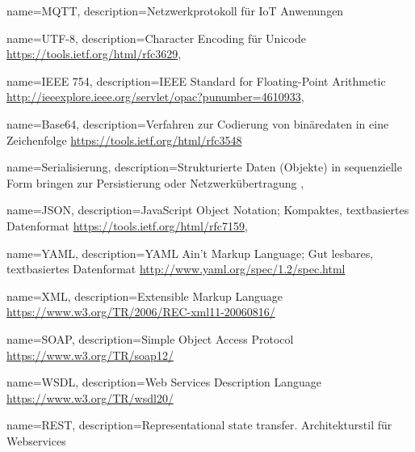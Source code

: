 








{
    name=MQTT,
    description={Netzwerkprotokoll für IoT Anwenungen}
}


{
    name=UTF-8,
    description={Character Encoding für Unicode \url{https://tools.ietf.org/html/rfc3629}}, 
}

{
    name=IEEE 754,
    description={IEEE Standard for Floating-Point Arithmetic   \url{http://ieeexplore.ieee.org/servlet/opac?punumber=4610933}}, 
}


{
    name=Base64,
    description={Verfahren zur Codierung von binäredaten in eine Zeichenfolge
     \url{https://tools.ietf.org/html/rfc3548}}
}

{
    name=Serialisierung,
    description={Strukturierte Daten (Objekte) in sequenzielle Form bringen zur Persistierung oder Netzwerkübertragung }, 
}

{
    name=JSON,
    description={JavaScript Object Notation; Kompaktes, textbasiertes Datenformat
    \url{https://tools.ietf.org/html/rfc7159}}, 
}

{
    name=YAML,
    description={YAML Ain't Markup Language; Gut lesbares, textbasiertes Datenformat
    \url{http://www.yaml.org/spec/1.2/spec.html}}
}

{
    name=XML,
    description={Extensible Markup Language \url{https://www.w3.org/TR/2006/REC-xml11-20060816/}}
}

{
    name=SOAP,
    description={Simple Object Access Protocol \url{https://www.w3.org/TR/soap12/}}
}

{
    name=WSDL,
    description={Web Services Description Language \url{https://www.w3.org/TR/wsdl20/}}
}

{
    name=REST,
    description={Representational state transfer. Architekturstil für Webservices}
}